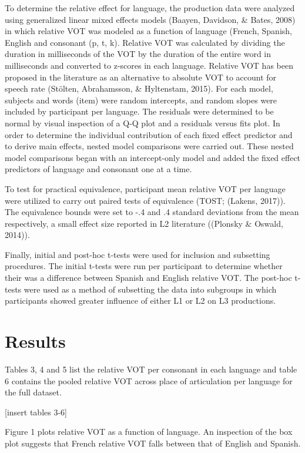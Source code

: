 \documentclass[
  english,
  man]{apa6}
\begin{document}
To determine the relative effect for language, the production data were analyzed using generalized linear mixed effects models (Baayen, Davidson, \& Bates, 2008) in which relative VOT was modeled as a function of language (French, Spanish, English and consonant (p, t, k).
Relative VOT was calculated by dividing the duration in milliseconds of the VOT by the duration of the entire word in milliseconds and converted to z-scores in each language.
Relative VOT has been proposed in the literature as an alternative to absolute VOT to account for speech rate (Stölten, Abrahamsson, \& Hyltenstam, 2015).
For each model, subjects and words (item) were random intercepts, and random slopes were included by participant per language.
The residuals were determined to be normal by visual inspection of a Q-Q plot and a residuals versus fits plot.
In order to determine the individual contribution of each fixed effect predictor and to derive main effects, nested model comparisons were carried out.
These nested model comparisons began with an intercept-only model and added the fixed effect predictors of language and consonant one at a time.

To test for practical equivalence, participant mean relative VOT per language were utilized to carry out paired tests of equivalence (TOST; (Lakens, 2017)).
The equivalence bounds were set to -.4 and .4 standard deviations from the mean respectively, a small effect size reported in L2 literature ((Plonsky \& Oswald, 2014)).

Finally, initial and post-hoc t-tests were used for inclusion and subsetting procedures.
The initial t-tests were run per participant to determine whether their was a difference between Spanish and English relative VOT.
The post-hoc t-tests were used as a method of subsetting the data into subgroups in which participants showed greater influence of either L1 or L2 on L3 productions.

\hypertarget{results}{%
\section{Results}\label{results}}

Tables 3, 4 and 5 list the relative VOT per consonant in each language and table 6 contains the pooled relative VOT across place of articulation per language for the full dataset.

{[}insert tables 3-6{]}

Figure 1 plots relative VOT as a function of language.
An inspection of the box plot suggests that French relative VOT falls between that of English and Spanish.
\end{document}
